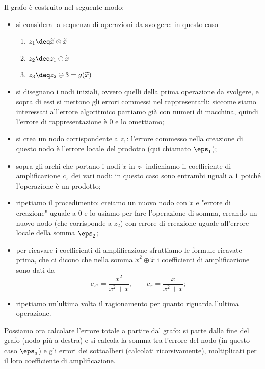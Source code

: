 \begin{example}
    Il grafo è costruito nel seguente modo:
    \begin{itemize}
        \item si considera la sequenza di operazioni da svolgere: in questo caso \begin{enumerate}
            \item $z_1 \deq \tilde x \otimes \tilde x$
            \item $z_2 \deq z_1 \oplus \tilde x$
            \item $z_3 \deq z_2 \ominus 3 = g(\tilde x)$   
        \end{enumerate}
        \item si disegnano i nodi iniziali, ovvero quelli della prima operazione da svolgere, e sopra di essi si mettono gli errori commessi nel rappresentarli: siccome siamo interessati all'errore algoritmico partiamo già con numeri di macchina, quindi l'errore di rappresentazione è $0$ e lo omettiamo;
        \item si crea un nodo corrispondente a $z_1$: l'errore commesso nella creazione di questo nodo è l'errore locale del prodotto (qui chiamato $\eps_1$); 
        \item sopra gli archi che portano i nodi $\tilde x$ in $z_1$ indichiamo il coefficiente di amplificazione $c_x$ dei vari nodi: in questo caso sono entrambi uguali a $1$ poiché l'operazione è un prodotto;
        \item ripetiamo il procedimento: creiamo un nuovo nodo con $\tilde x$ e "errore di creazione" uguale a $0$ e lo usiamo per fare l'operazione di somma, creando un nuovo nodo (che corrisponde a $z_2$) con errore di creazione uguale all'errore locale della somma $\eps_2$;
        \item per ricavare i coefficienti di amplificazione sfruttiamo le formule ricavate prima, che ci dicono che nella somma $\tilde x^2 \oplus \tilde x$ i coefficienti di amplificazione sono dati da \[
            c_{x^2} = \frac{x^2}{x^2+x}, \qquad c_x = \frac{x}{x^2+x};
        \]
        \item ripetiamo un'ultima volta il ragionamento per quanto riguarda l'ultima operazione.
    \end{itemize}

    Possiamo ora calcolare l'errore totale a partire dal grafo: si parte dalla fine del grafo (nodo più a destra) e si calcola la somma tra l'errore del nodo (in questo caso $\eps_3$) e gli errori dei sottoalberi (calcolati ricorsivamente), moltiplicati per il loro coefficiente di amplificazione.


\end{example}
